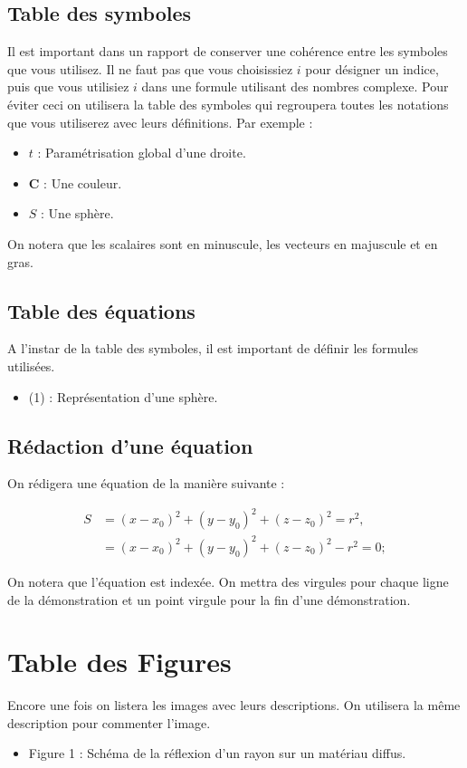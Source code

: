 \documentclass[french,12pt]{article}
\begin{document}
\subsection{Table des symboles}
Il est important dans un rapport de conserver une cohérence entre les symboles que vous utilisez. Il ne faut pas que vous choisissiez $i$ pour désigner un indice, puis que vous utilisiez $i$ dans une formule utilisant des nombres complexe. Pour éviter ceci on utilisera la table des symboles qui regroupera toutes les notations que vous utiliserez avec leurs définitions. Par exemple :

\begin{itemize}
	\item $t$ : Paramétrisation global d'une droite.
	\item $\mathbf{C}$ : Une couleur.
	\item $S$ : Une sphère.
\end{itemize}

On notera que les scalaires sont en minuscule, les vecteurs en majuscule et en gras.

\subsection{Table des équations}
A l'instar de la table des symboles, il est important de définir les formules utilisées.

\begin{itemize}
	\item (1) : Représentation d'une sphère.
\end{itemize}

\subsection{Rédaction d'une équation}
On rédigera une équation de la manière suivante : 

\begin{equation} \label{eq1}
\begin{split}
S & = (x-x_0)^2+(y-y_0)^2+(z-z_0)^2 = r^2, \\
 & = (x-x_0)^2+(y-y_0)^2+(z-z_0)^2 -r^2 = 0;
\end{split}
\end{equation}

On notera que l'équation est indexée. On mettra des virgules pour chaque ligne de la démonstration et un point virgule pour la fin d'une démonstration.

\section{Table des Figures}
Encore une fois on listera les images avec leurs descriptions. On utilisera la même description pour commenter l'image.
\begin{itemize}
	\item Figure 1 : Schéma de la réflexion d'un rayon sur un matériau diffus.
\end{itemize}
\end{document}
